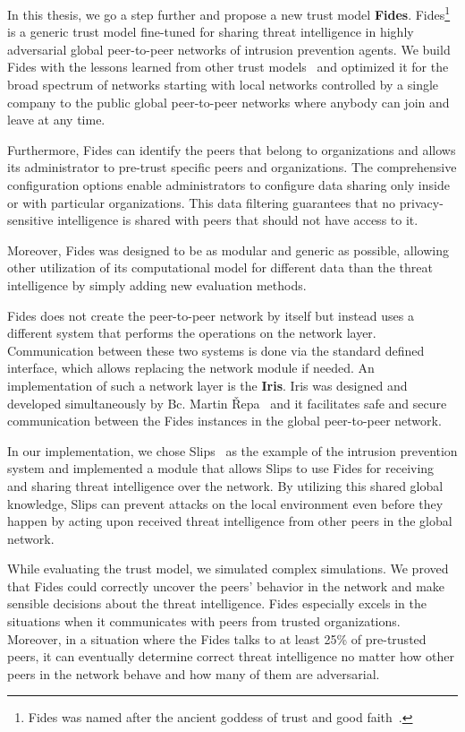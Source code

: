 In this thesis, we go a step further and propose a new trust model \textbf{Fides}.
Fides\footnote{Fides was named after the ancient goddess of trust and good faith~\cite{enwiki:1086924565}.} is a generic trust model fine-tuned for sharing threat intelligence in highly adversarial global peer-to-peer networks of intrusion prevention agents.
We build Fides with the lessons learned from other trust models~\cite{sort, dita} and optimized it for the broad spectrum of networks starting with local networks controlled by a single company to the public global peer-to-peer networks where anybody can join and leave at any time.

Furthermore, Fides can identify the peers that belong to organizations and allows its administrator to pre-trust specific peers and organizations. The comprehensive configuration options enable administrators to configure data sharing only inside or with particular organizations. This data filtering guarantees that no privacy-sensitive intelligence is shared with peers that should not have access to it.

Moreover, Fides was designed to be as modular and generic as possible, allowing other utilization of its computational model for different data than the threat intelligence by simply adding new evaluation methods.

Fides does not create the peer-to-peer network by itself but instead uses a different system that performs the operations on the network layer.
Communication between these two systems is done via the standard defined interface, which allows replacing the network module if needed.
An implementation of such a network layer is the \textbf{Iris}. Iris was designed and developed simultaneously by Bc. Martin Řepa~\cite{nl} and it facilitates safe and secure communication between the Fides instances in the global peer-to-peer network.

In our implementation, we chose Slips~\cite{slips} as the example of the intrusion prevention system and implemented a module that allows Slips to use Fides for receiving and sharing threat intelligence over the network. 
By utilizing this shared global knowledge, Slips can prevent attacks on the local environment even before they happen by acting upon received threat intelligence from other peers in the global network.

While evaluating the trust model, we simulated complex simulations. We proved that Fides could correctly uncover the peers' behavior in the network and make sensible decisions about the threat intelligence. 
Fides especially excels in the situations when it communicates with peers from trusted organizations.
Moreover, in a situation where the Fides talks to at least 25\% of pre-trusted peers, it can eventually determine correct threat intelligence no matter how other peers in the network behave and how many of them are adversarial.

